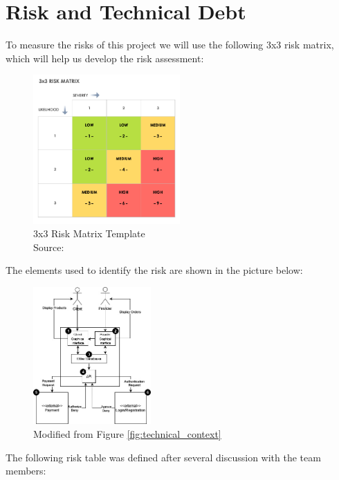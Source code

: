 \section{Risk and Technical Debt}

To measure the risks of this project we will use the following 3x3 risk matrix, which will help us develop the 
\gls{risk assessment}:

\begin{figure}[H]
    \centering
    \includegraphics[width=0.5\textwidth]{assets/Risk-Matrix.png}
    \caption{3x3 Risk Matrix Template\\ Source: \citet{refonline:smtrisk}  }
    \label{fig:risk_matrix_template}
\end{figure}


The elements used to identify the risk are shown in the picture below:

\begin{figure}[H]
    \centering
    \includegraphics[width=0.4\textwidth]{assets/risk_technical_context.jpg}
    \caption{Modified from Figure \ref{fig:technical_context}}
    \label{fig:risk_technical_context}
\end{figure}

\newpage
The following risk table was defined after several discussion with the team members:

